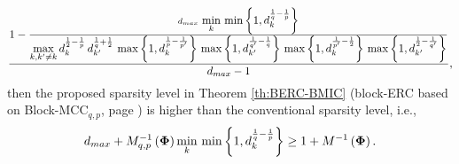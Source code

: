\begin{property}
\begin{gather*}
\begin{aligned}
\frac{1 - \frac{d_{max} \, \displaystyle\min_{k} \, \min \left\lbrace 1 , d_k^{\frac1q - \frac1p} \right\rbrace}{\displaystyle\max_{k,k' \neq k} d_{k}^{\frac12 - \frac1p} \, d_{k'}^{\frac1q + \frac12} \, \max \left\lbrace 1 , d_k^{\frac1p - \frac{1}{p'}} \right\rbrace \, \max \left\lbrace 1 , d_{k'}^{\frac{1}{q'} - \frac1q} \right\rbrace \, \max \left\lbrace 1 , d_k^{\frac{1}{p'} -\frac12} \right\rbrace \, \max \left\lbrace 1 , d_{k'}^{\frac{1}{2} - \frac{1}{q'}} \right\rbrace}}{d_{max} - 1},
\end{aligned}
\end{gather*}
then the proposed sparsity level in Theorem \ref{th:BERC-BMIC} (block-ERC based on Block-MCC$_{q,p}$, page \pageref{th:BERC-BMIC}) is higher than the conventional sparsity level, i.e.,
\begin{gather*}
d_{max} + M_{q,p}^{-1}\left( \boldsymbol{\Phi} \right) \displaystyle\min_{k} \, \min \left\lbrace 1 , d_k^{\frac1q - \frac1p} \right\rbrace
\geq 1 + M^{-1}\left( \boldsymbol{\Phi} \right).
\end{gather*}
\end{property}
